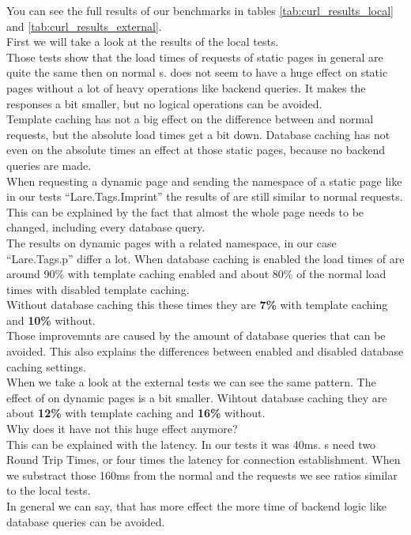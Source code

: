 You can see the full results of our benchmarks in tables \ref{tab:curl_results_local} and \ref{tab:curl_results_external}.
\\
First we will take a look at the results of the local tests.
\\
Those tests show that the load times of \lare{} requests of static pages in general are quite the same then on normal \httpRequest{}s.
\lare{} does not seem to have a huge effect on static pages without a lot of heavy operations like backend queries. It makes the responses a bit smaller, but no logical operations can be avoided.
\\
Template caching has not a big effect on the difference between \lare{} and normal requests, but the absolute load times get a bit down.
Database caching has not even on the absolute times an effect at those static pages, because no backend queries are made.
\\
When requesting a dynamic page and sending the namespace of a static page like in our tests \enquote{Lare.Tags.Imprint} the results of \lare{} are still similar to normal requests.
This can be explained by the fact that almost the whole page needs to be changed, including every database query.
\\
The results on dynamic pages with a related namespace, in our case \enquote{Lare.Tags.p} differ a lot.
When database caching is enabled the load times of \lare{} are around 90\% with template caching enabled and about 80\% of the normal load times with disabled template caching.
\\
Without database caching this these times they are \textbf{7\%} with template caching and \textbf{10\%} without.
\\
Those improvemnts are caused by the amount of database queries that can be avoided. This also explains the differences between enabled and disabled database caching settings.
\\
When we take a look at the external tests we can see the same pattern.
The effect of \lare{} on dynamic pages is a bit smaller.
Wihtout database caching they are about \textbf{12\%} with template caching and \textbf{16\%} without.
\\
Why does it have not this huge effect anymore?
\\
This can be explained with the latency.
In our tests it was 40ms.
\httpRequest{}s need two Round Trip Times, or four times the latency for connection establishment.
When we substract those 160ms from the normal and the \lare{} requests we see ratios similar to the local tests.
\\
In general we can say, that \lare{} has more effect the more time of backend logic like database queries can be avoided.

